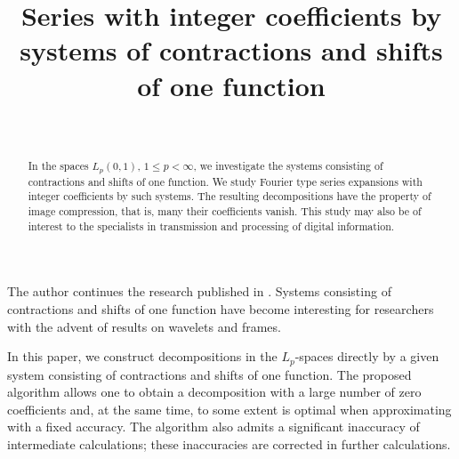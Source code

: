 \documentclass[
11pt,%
tightenlines,%
twoside,%
onecolumn,%
nofloats,%
nobibnotes,%
nofootinbib,%
superscriptaddress,%
noshowpacs,%
centertags]%
{revtex4}
\begin{document}

\title{Series  with integer coefficients by systems  of
contractions and shifts of one function}

\author{~}
 




\begin{abstract}
In the spaces $L_p (0,1)$, $1 \leq p <\infty $, we investigate the
systems consisting of contractions and shifts of one function. We
study Fourier type series expansions with integer coefficients by
such systems. The resulting decompositions have the property of
image compression, that is, many their coefficients vanish. This
study may also be of interest to the specialists in transmission
and processing of digital information.
\end{abstract}



 \maketitle


The  author continues the research published in
\cite{fo,f1,f2,f3,f4}. Systems consisting of contractions and
shifts of one function have become interesting for researchers
with the advent of results on wavelets and  frames.

In  this paper, we construct decompositions in the $L_p$-spaces
directly by a given system consisting of contractions and shifts
of one function. The proposed algorithm allows one to obtain a
decomposition  with a large number of zero coefficients and, at
the same time, to some extent is optimal when approximating with a
fixed accuracy. The algorithm also admits a significant inaccuracy
of intermediate calculations; these inaccuracies are corrected in
further calculations.
\end{document}
